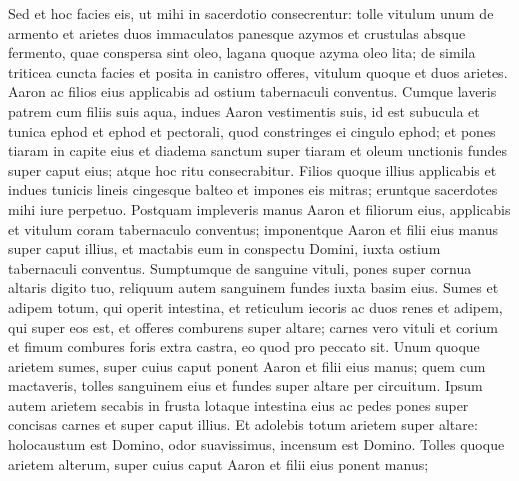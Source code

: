 \begin{biblechapter}
\begin{biblechapter}
\begin{biblechapter}
\begin{biblechapter}
\begin{biblechapter}
\begin{biblechapter}
\begin{biblechapter}
\begin{biblechapter}
\begin{biblechapter}
\begin{biblechapter}
\begin{biblechapter}
\begin{biblechapter}
\begin{biblechapter}
\begin{biblechapter}
\begin{biblechapter}
\begin{biblechapter}
\begin{biblechapter}
\begin{biblechapter}
\begin{biblechapter}
\begin{biblechapter}
\begin{biblechapter}
\begin{biblechapter}
\begin{biblechapter}
\begin{biblechapter}
\begin{biblechapter}
\begin{biblechapter}
\begin{biblechapter}
\begin{biblechapter}
\begin{biblechapter}
\verse Sed et hoc facies eis, ut mihi in sacerdotio consecrentur: tolle vitulum unum de armento et arietes duos immaculatos 
\verse panesque azymos et crustulas absque fermento, quae conspersa sint oleo, lagana quoque azyma oleo lita; de simila triticea cuncta facies 
\verse et posita in canistro offeres, vitulum quoque et duos arietes. 
\verse Aaron ac filios eius applicabis ad ostium tabernaculi conventus. Cumque laveris patrem cum filiis suis aqua, 
\verse indues Aaron vestimentis suis, id est subucula et tunica ephod et ephod et pectorali, quod constringes ei cingulo ephod; 
\verse et pones tiaram in capite eius et diadema sanctum super tiaram 
\verse et oleum unctionis fundes super caput eius; atque hoc ritu consecrabitur. 
\verse Filios quoque illius applicabis et indues tunicis lineis cingesque balteo 
\verse et impones eis mitras; eruntque sacerdotes mihi iure perpetuo.
 Postquam impleveris manus Aaron et filiorum eius, 
\verse applicabis et vitulum coram tabernaculo conventus; imponentque Aaron et filii eius manus super caput illius, 
\verse et mactabis eum in conspectu Domini, iuxta ostium tabernaculi conventus. 
 \verse Sumptumque de sanguine vituli, pones super cornua altaris digito tuo, reliquum autem sanguinem fundes iuxta basim eius. 
\verse Sumes et adipem totum, qui operit intestina, et reticulum iecoris ac duos renes et adipem, qui super eos est, et offeres comburens super altare; 
\verse carnes vero vituli et corium et fimum combures foris extra castra, eo quod pro peccato sit.
 \verse Unum quoque arietem sumes, super cuius caput ponent Aaron et filii eius manus; 
\verse quem cum mactaveris, tolles sanguinem eius et fundes super altare per circuitum. 
\verse Ipsum autem arietem secabis in frusta lotaque intestina eius ac pedes pones super concisas carnes et super caput illius. 
\verse Et adolebis totum arietem super altare: holocaustum est Domino, odor suavissimus, incensum est Domino.
 \verse Tolles quoque arietem alterum, super cuius caput Aaron et filii eius ponent manus; 

\end{biblechapter}
\end{biblechapter}
\end{biblechapter}
\end{biblechapter}
\end{biblechapter}
\end{biblechapter}
\end{biblechapter}
\end{biblechapter}
\end{biblechapter}
\end{biblechapter}
\end{biblechapter}
\end{biblechapter}
\end{biblechapter}
\end{biblechapter}
\end{biblechapter}
\end{biblechapter}
\end{biblechapter}
\end{biblechapter}
\end{biblechapter}
\end{biblechapter}
\end{biblechapter}
\end{biblechapter}
\end{biblechapter}
\end{biblechapter}
\end{biblechapter}
\end{biblechapter}
\end{biblechapter}
\end{biblechapter}
\end{biblechapter}
